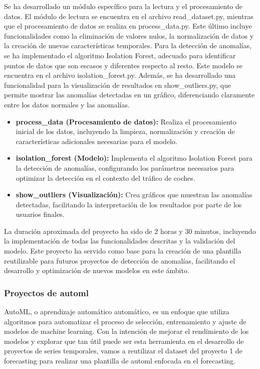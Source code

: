 Se ha desarrollado un módulo específico para la lectura y el procesamiento de datos. 
El módulo de lectura se encuentra en el archivo read\_dataset.py, mientras que el 
procesamiento de datos se realiza en process\_data.py. Este último incluye 
funcionalidades como la eliminación de valores nulos, la normalización de datos 
y la creación de nuevas características temporales. Para la detección de anomalías, 
se ha implementado el algoritmo Isolation Forest, adecuado para identificar puntos 
de datos que son escasos y diferentes respecto al resto. Este modelo se encuentra 
en el archivo isolation\_forest.py. Además, se ha desarrollado una funcionalidad 
para la visualización de resultados en show\_outliers.py, que permite mostrar las 
anomalías detectadas en un gráfico, diferenciando claramente entre los datos 
normales y las anomalías.

\begin{itemize}
    \item \textbf{process\_data (Procesamiento de datos):} Realiza el procesamiento 
    inicial de los datos, incluyendo la limpieza, normalización y creación de 
    características adicionales necesarias para el modelo.
    \item \textbf{isolation\_forest (Modelo):} Implementa el algoritmo Isolation 
    Forest para la detección de anomalías, configurando los parámetros necesarios 
    para optimizar la detección en el contexto del tráfico de coches.
    \item \textbf{show\_outliers (Visualización):} Crea gráficos que muestran las 
    anomalías detectadas, facilitando la interpretación de los resultados por parte 
    de los usuarios finales.
\end{itemize}
    
La duración aproximada del proyecto ha sido de 2 horas y 30 minutos, incluyendo la 
implementación de todas las funcionalidades descritas y la validación del modelo. 
Este proyecto ha servido como base para la creación de una plantilla reutilizable 
para futuros proyectos de detección de anomalías, facilitando el desarrollo y 
optimización de nuevos modelos en este ámbito.

\subsubsection{Proyectos de automl}
AutoML, o aprendizaje automático automático, es un enfoque que utiliza algoritmos 
para automatizar el proceso de selección, entrenamiento y ajuste de modelos de 
machine learning. Con la intención de mejorar el rendimiento de los modelos y
explorar que tan útil puede ser esta herramienta en el desarrollo de proyectos
de series temporales, vamos a reutilizar el dataset del proyecto 1 de forecasting
para realizar una plantilla de automl enfocada en el forecasting.\medskip

